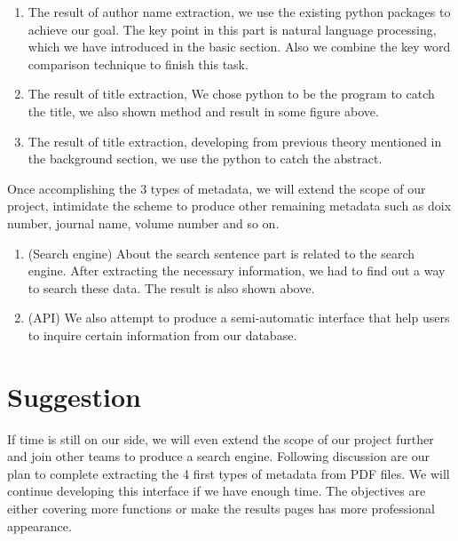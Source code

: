 		\begin{enumerate}
			\item The result of author name extraction, we use the existing python packages to achieve our goal.
			The key point in this part is natural language processing, which we have introduced in the basic section. 
			Also we combine the key word comparison technique to finish this task.
			\item The result of title extraction, We chose python to be the program to catch the title, we also shown method and result in some figure above.
			\item The result of title extraction, developing from previous theory mentioned in the background section, 
			we use the python to catch the abstract.
		\end{enumerate}	
Once accomplishing the 3 types of metadata, we will extend the scope of our project, intimidate the scheme to produce other remaining metadata such as doix number, journal name, volume number and so on. 
		\begin{enumerate}
			\item (Search engine) About the search sentence part is related to the search engine. After extracting the necessary information, we had to find out a way to search these data. The result is also shown above.
			\item (API) We also attempt to produce a semi-automatic interface that help users to inquire certain information from our database.
		\end{enumerate}	

\section*{Suggestion}
If time is still on our side, we will even extend the scope of our project further and join other teams to produce a search engine. 
Following discussion are our plan to complete extracting the 4 first types of metadata from PDF files.
We will continue developing this interface if we have enough time. 
The objectives are either covering more functions or make the results pages has more professional appearance.
 
\newpage %